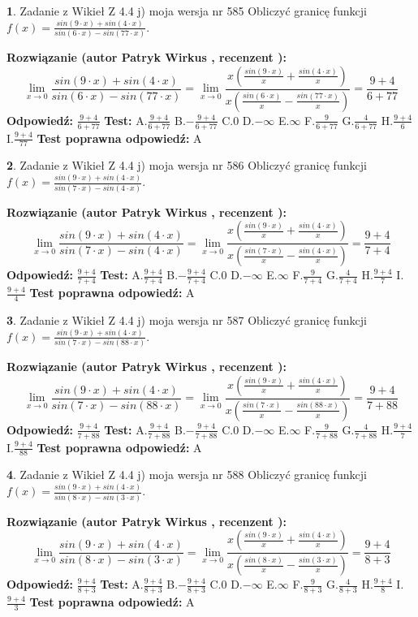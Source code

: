 \documentclass[12pt, a4paper]{article}
\theoremstyle{definition} %
\newtheorem{zad}{}
\newcommand{\zadStart}[1]{\begin{zad}#1\newline}
\newcommand{\zadStop}{\end{zad}}
\newcommand{\rozwStart}[2]{\noindent \textbf{Rozwiązanie (autor #1 , recenzent #2): }\newline}
\newcommand{\rozwStop}{\newline}
\newcommand{\odpStart}{\noindent \textbf{Odpowiedź:}\newline}
\newcommand{\odpStop}{\newline}
\newcommand{\testStart}{\noindent \textbf{Test:}\newline}
\newcommand{\testStop}{\newline}
\newcommand{\kluczStart}{\noindent \textbf{Test poprawna odpowiedź:}\newline}
\newcommand{\kluczStop}{\newline}
\begin{document}
\zadStart{Zadanie z Wikieł Z 4.4 j) moja wersja nr 585}
Obliczyć granicę funkcji $f(x)=\frac{sin(9\cdot x) +sin(4\cdot x)}{sin(6\cdot x) -sin(77\cdot x)}$.
\zadStop
\rozwStart{Patryk Wirkus}{}
$$\lim\limits_{x\to 0}\frac{sin(9\cdot x) +sin(4\cdot x)}{sin(6\cdot x) -sin(77\cdot x)}=\lim\limits_{x\to 0}\frac{x(\frac{sin(9\cdot x)}{x}+\frac{sin(4\cdot x)}{x})}{x(\frac{sin(6\cdot x)}{x}-\frac{sin(77\cdot x)}{x})}=\frac{9+4}{6+77}$$
\rozwStop
\odpStart
$\frac{9+4}{6+77}$
\odpStop
\testStart
A.$\frac{9+4}{6+77}$
B.$-\frac{9+4}{6+77}$
C.$0$
D.$-\infty$
E.$\infty$
F.$\frac{9}{6+77}$
G.$\frac{4}{6+77}$
H.$\frac{9+4}{6}$
I.$\frac{9+4}{77}$
\testStop
\kluczStart
A
\kluczStop



\zadStart{Zadanie z Wikieł Z 4.4 j) moja wersja nr 586}
Obliczyć granicę funkcji $f(x)=\frac{sin(9\cdot x) +sin(4\cdot x)}{sin(7\cdot x) -sin(4\cdot x)}$.
\zadStop
\rozwStart{Patryk Wirkus}{}
$$\lim\limits_{x\to 0}\frac{sin(9\cdot x) +sin(4\cdot x)}{sin(7\cdot x) -sin(4\cdot x)}=\lim\limits_{x\to 0}\frac{x(\frac{sin(9\cdot x)}{x}+\frac{sin(4\cdot x)}{x})}{x(\frac{sin(7\cdot x)}{x}-\frac{sin(4\cdot x)}{x})}=\frac{9+4}{7+4}$$
\rozwStop
\odpStart
$\frac{9+4}{7+4}$
\odpStop
\testStart
A.$\frac{9+4}{7+4}$
B.$-\frac{9+4}{7+4}$
C.$0$
D.$-\infty$
E.$\infty$
F.$\frac{9}{7+4}$
G.$\frac{4}{7+4}$
H.$\frac{9+4}{7}$
I.$\frac{9+4}{4}$
\testStop
\kluczStart
A
\kluczStop



\zadStart{Zadanie z Wikieł Z 4.4 j) moja wersja nr 587}
Obliczyć granicę funkcji $f(x)=\frac{sin(9\cdot x) +sin(4\cdot x)}{sin(7\cdot x) -sin(88\cdot x)}$.
\zadStop
\rozwStart{Patryk Wirkus}{}
$$\lim\limits_{x\to 0}\frac{sin(9\cdot x) +sin(4\cdot x)}{sin(7\cdot x) -sin(88\cdot x)}=\lim\limits_{x\to 0}\frac{x(\frac{sin(9\cdot x)}{x}+\frac{sin(4\cdot x)}{x})}{x(\frac{sin(7\cdot x)}{x}-\frac{sin(88\cdot x)}{x})}=\frac{9+4}{7+88}$$
\rozwStop
\odpStart
$\frac{9+4}{7+88}$
\odpStop
\testStart
A.$\frac{9+4}{7+88}$
B.$-\frac{9+4}{7+88}$
C.$0$
D.$-\infty$
E.$\infty$
F.$\frac{9}{7+88}$
G.$\frac{4}{7+88}$
H.$\frac{9+4}{7}$
I.$\frac{9+4}{88}$
\testStop
\kluczStart
A
\kluczStop



\zadStart{Zadanie z Wikieł Z 4.4 j) moja wersja nr 588}
Obliczyć granicę funkcji $f(x)=\frac{sin(9\cdot x) +sin(4\cdot x)}{sin(8\cdot x) -sin(3\cdot x)}$.
\zadStop
\rozwStart{Patryk Wirkus}{}
$$\lim\limits_{x\to 0}\frac{sin(9\cdot x) +sin(4\cdot x)}{sin(8\cdot x) -sin(3\cdot x)}=\lim\limits_{x\to 0}\frac{x(\frac{sin(9\cdot x)}{x}+\frac{sin(4\cdot x)}{x})}{x(\frac{sin(8\cdot x)}{x}-\frac{sin(3\cdot x)}{x})}=\frac{9+4}{8+3}$$
\rozwStop
\odpStart
$\frac{9+4}{8+3}$
\odpStop
\testStart
A.$\frac{9+4}{8+3}$
B.$-\frac{9+4}{8+3}$
C.$0$
D.$-\infty$
E.$\infty$
F.$\frac{9}{8+3}$
G.$\frac{4}{8+3}$
H.$\frac{9+4}{8}$
I.$\frac{9+4}{3}$
\testStop
\kluczStart
A
\kluczStop
\end{document}
